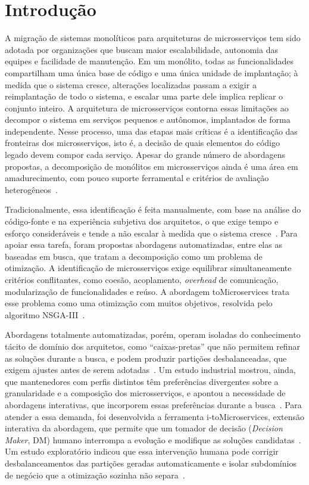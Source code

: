\documentclass[conference]{IEEEtran}
\newcommand{\itm}{\mbox{i-toMicroservices}}
\begin{document}
\section{Introdução}\label{sec:introducao}

A migração de sistemas monolíticos para arquiteturas de microsserviços tem sido adotada por organizações que buscam maior escalabilidade, autonomia das equipes e facilidade de manutenção. Em um monólito, todas as funcionalidades compartilham uma única base de código e uma única unidade de implantação; à medida que o sistema cresce, alterações localizadas passam a exigir a reimplantação de todo o sistema, e escalar uma parte dele implica replicar o conjunto inteiro. A arquitetura de microsserviços contorna essas limitações ao decompor o sistema em serviços pequenos e autônomos, implantados de forma independente. Nesse processo, uma das etapas mais críticas é a identificação das fronteiras dos microsserviços, isto é, a decisão de quais elementos do código legado devem compor cada serviço. Apesar do grande número de abordagens propostas, a decomposição de monólitos em microsserviços ainda é uma área em amadurecimento, com pouco suporte ferramental e critérios de avaliação heterogêneos~\cite{abgaz2023}.

Tradicionalmente, essa identificação é feita manualmente, com base na análise do código-fonte e na experiência subjetiva dos arquitetos, o que exige tempo e esforço consideráveis e tende a não escalar à medida que o sistema cresce~\cite{wang2024,castanho2026hitl}. Para apoiar essa tarefa, foram propostas abordagens automatizadas, entre elas as baseadas em busca, que tratam a decomposição como um problema de otimização. A identificação de microsserviços exige equilibrar simultaneamente critérios conflitantes, como coesão, acoplamento, \textit{overhead} de comunicação, modularização de funcionalidades e reúso. A abordagem toMicroservices trata esse problema como uma otimização com muitos objetivos, resolvida pelo algoritmo NSGA-III~\cite{carvalho2020,assuncao2021}.

Abordagens totalmente automatizadas, porém, operam isoladas do conhecimento tácito de domínio dos arquitetos, como ``caixas-pretas'' que não permitem refinar as soluções durante a busca, e podem produzir partições desbalanceadas, que exigem ajustes antes de serem adotadas~\cite{castanho2026tool,castanho2026hitl}. Um estudo industrial mostrou, ainda, que mantenedores com perfis distintos têm preferências divergentes sobre a granularidade e a composição dos microsserviços, e apontou a necessidade de abordagens interativas, que incorporem essas preferências durante a busca~\cite{carvalho2024}. Para atender a essa demanda, foi desenvolvida a ferramenta \itm{}, extensão interativa da abordagem, que permite que um tomador de decisão (\textit{Decision Maker}, DM) humano interrompa a evolução e modifique as soluções candidatas~\cite{castanho2026tool}. Um estudo exploratório indicou que essa intervenção humana pode corrigir desbalanceamentos das partições geradas automaticamente e isolar subdomínios de negócio que a otimização sozinha não separa~\cite{castanho2026hitl}.
\end{document}
